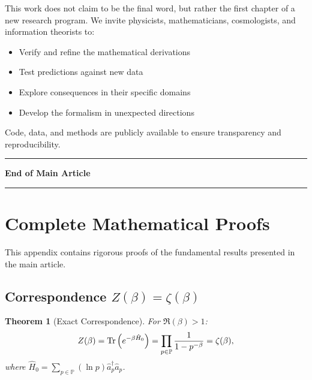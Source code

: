 \documentclass[11pt, a4paper]{article}
\theoremstyle{plain}
\newtheorem{theorem}{Theorem}[section]
\theoremstyle{definition}
\begin{document}
This work does not claim to be the final word, but rather the first chapter of a new research program. We invite physicists, mathematicians, cosmologists, and information theorists to:
\begin{itemize}
    \item Verify and refine the mathematical derivations
    \item Test predictions against new data
    \item Explore consequences in their specific domains
    \item Develop the formalism in unexpected directions
\end{itemize}

Code, data, and methods are publicly available to ensure transparency and reproducibility.

\begin{center}
\rule{0.5\textwidth}{0.5pt}

\textbf{End of Main Article}

\rule{0.5\textwidth}{0.5pt}
\end{center}


\appendix


\section{Complete Mathematical Proofs}
\label{app:proofs}

This appendix contains rigorous proofs of the fundamental results presented in the main article.

\subsection{Correspondence \texorpdfstring{$Z(\beta) = \zeta(\beta)$}{Z(β)=ζ(β)}}
\label{app:zeta_correspondence_proof}

\begin{theorem}[Exact Correspondence]
For $\Re(\beta) > 1$:
\begin{equation}
Z(\beta) = \Tr\left(e^{-\beta \hat{H}_0}\right) = \prod_{p \in \mathbb{P}} \frac{1}{1 - p^{-\beta}} = \zeta(\beta),
\end{equation}
where $\hat{H}_0 = \sum_{p \in \mathbb{P}} (\ln p) \hat{a}_p^\dagger \hat{a}_p$.
\end{theorem}
\end{document}
